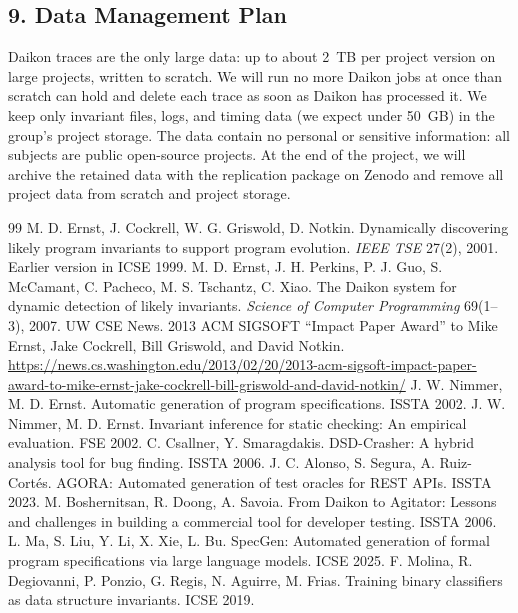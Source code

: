 \documentclass{article}
\begin{document}
\subsection*{9. Data Management Plan}
Daikon traces are the only large data: up to about 2~TB per project version on large projects, written to scratch.
We will run no more Daikon jobs at once than scratch can hold and delete each trace as soon as Daikon has processed it.
We keep only invariant files, logs, and timing data (we expect under 50~GB) in the group's project storage.
The data contain no personal or sensitive information: all subjects are public open-source projects.
At the end of the project, we will archive the retained data with the replication package on Zenodo and remove all project data from scratch and project storage.

\begin{thebibliography}{99}\small\sloppy
{} M. D. Ernst, J. Cockrell, W. G. Griswold, D. Notkin. Dynamically discovering likely program invariants to support program evolution. \emph{IEEE TSE} 27(2), 2001. Earlier version in ICSE 1999.
 M. D. Ernst, J. H. Perkins, P. J. Guo, S. McCamant, C. Pacheco, M. S. Tschantz, C. Xiao. The Daikon system for dynamic detection of likely invariants. \emph{Science of Computer Programming} 69(1--3), 2007.
 UW CSE News. 2013 ACM SIGSOFT ``Impact Paper Award'' to Mike Ernst, Jake Cockrell, Bill Griswold, and David Notkin. \url{https://news.cs.washington.edu/2013/02/20/2013-acm-sigsoft-impact-paper-award-to-mike-ernst-jake-cockrell-bill-griswold-and-david-notkin/}
 J. W. Nimmer, M. D. Ernst. Automatic generation of program specifications. ISSTA 2002.
 J. W. Nimmer, M. D. Ernst. Invariant inference for static checking: An empirical evaluation. FSE 2002.
 C. Csallner, Y. Smaragdakis. DSD-Crasher: A hybrid analysis tool for bug finding. ISSTA 2006.
 J. C. Alonso, S. Segura, A. Ruiz-Cort\'es. AGORA: Automated generation of test oracles for REST APIs. ISSTA 2023.
 M. Boshernitsan, R. Doong, A. Savoia. From Daikon to Agitator: Lessons and challenges in building a commercial tool for developer testing. ISSTA 2006.
 L. Ma, S. Liu, Y. Li, X. Xie, L. Bu. SpecGen: Automated generation of formal program specifications via large language models. ICSE 2025.
 F. Molina, R. Degiovanni, P. Ponzio, G. Regis, N. Aguirre, M. Frias. Training binary classifiers as data structure invariants. ICSE 2019.

\end{thebibliography}
\end{document}
